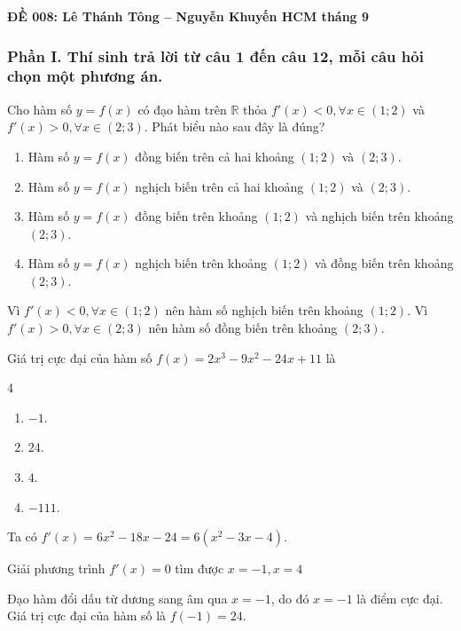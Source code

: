 \begin{center}
	\textbf{{\Huge ĐỀ 008: Lê Thánh Tông -- Nguyễn Khuyến HCM tháng 9}}
\end{center}
\subsubsection*{Phần I. Thí sinh trả lời từ câu 1 đến câu 12, mỗi câu hỏi chọn một phương án.}
\setcounter{bt}{0}\setcounter{bt}{0}
\begin{baitap}
	Cho hàm số $y=f(x)$ có đạo hàm trên $\mathbb{R}$ thỏa $f'(x) < 0, \forall x \in (1; 2)$ và $f'(x) > 0, \forall x \in (2; 3)$. Phát biểu nào sau đây là đúng?
	\begin{enumerate}
		\item Hàm số $y=f(x)$ đồng biến trên cả hai khoảng $(1; 2)$ và $(2; 3)$.
		\item Hàm số $y=f(x)$ nghịch biến trên cả hai khoảng $(1; 2)$ và $(2; 3)$.
		\item Hàm số $y=f(x)$ đồng biến trên khoảng $(1; 2)$ và nghịch biến trên khoảng $(2; 3)$.
		\item Hàm số $y=f(x)$ nghịch biến trên khoảng $(1; 2)$ và đồng biến trên khoảng $(2; 3)$.
	\end{enumerate}
	\begin{traloi}
		Vì $f'(x) < 0, \forall x \in (1; 2)$ nên hàm số nghịch biến trên khoảng $(1; 2)$.
		Vì $f'(x) > 0, \forall x \in (2; 3)$ nên hàm số đồng biến trên khoảng $(2; 3)$.
	\end{traloi}
\end{baitap}

\begin{baitap}
	Giá trị cực đại của hàm số $f(x) = 2x^3 - 9x^2 - 24x + 11$ là
	\begin{multicols}{4}
		\begin{enumerate}
			\item $-1$.
			\item $24$.
			\item $4$.
			\item $-111$.
		\end{enumerate}
	\end{multicols}
	\begin{traloi}
		\dapan{B}
		Ta có $f'(x) = 6x^2 - 18x - 24 = 6(x^2 - 3x - 4)$.
		
		Giải phương trình $f'(x) = 0 $ tìm được $	 x = -1, x = 4$
		
		Đạo hàm đổi dấu từ dương sang âm qua $x = -1$, do đó $x = -1$ là điểm cực đại.
		Giá trị cực đại của hàm số là $f(-1)  = 24$.
	\end{traloi}
\end{baitap}

